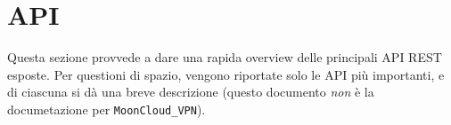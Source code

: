 \section{API}
Questa sezione provvede a dare una rapida overview delle principali API REST
esposte. Per questioni di spazio, vengono riportate solo le API più importanti,
e di ciascuna si dà una breve descrizione (questo documento \textit{non} è
la documetazione per \texttt{MoonCloud\_VPN}).